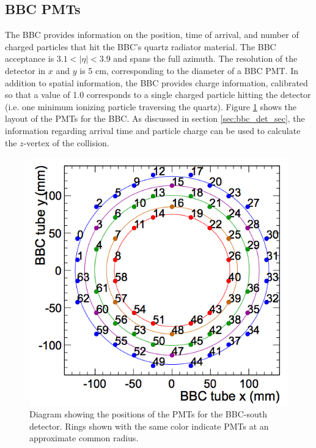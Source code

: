\subsection{BBC PMTs}
The BBC provides information on the position, time of arrival, and number of charged particles that hit the BBC's quartz radiator material. The BBC acceptance is $3.1 < |\eta| < 3.9$ and spans the full azimuth. The resolution of the detector in $x$ and $y$ is 5 cm, corresponding to the diameter of a BBC PMT. In addition to spatial information, the BBC provides charge information, calibrated so that a value of 1.0 corresponds to a single charged particle hitting the detector (i.e. one minimum ionizing particle traversing the quartz). Figure \ref{fig:bbc_rings} shows the layout of the PMTs for the BBC. As discussed in section \ref{sec:bbc_det_sec}, the information regarding arrival time and particle charge can be used to calculate the $z$-vertex of the collision. 
\begin{figure}[h!]
\begin{center}
\includegraphics[width=0.55\linewidth]{figs/bbc_rings.png}
\caption{Diagram showing the positions of the PMTs for the BBC-south detector. Rings shown with the same color indicate PMTs at an approximate common radius.}
\label{fig:bbc_rings}
\end{center}
\end{figure}


